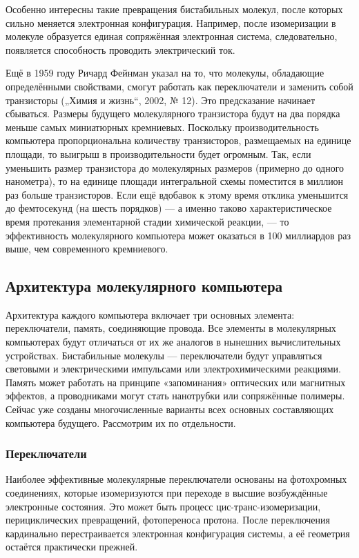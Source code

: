 \documentclass[titlepage, 12pt]{article}
\begin{document}
Особенно интересны такие превращения бистабильных молекул, после которых сильно меняется электронная конфигурация. Например, после изомеризации в молекуле образуется единая сопряжённая электронная система, следовательно, появляется способность проводить электрический ток.

Ещё в 1959 году Ричард Фейнман указал на то, что молекулы, обладающие определёнными свойствами, смогут работать как переключатели и заменить собой транзисторы („Химия и жизнь“, 2002, № 12). Это предсказание начинает сбываться. Размеры будущего молекулярного транзистора будут на два порядка меньше самых миниатюрных кремниевых. Поскольку производительность компьютера пропорциональна количеству транзисторов, размещаемых на единице площади, то выигрыш в производительности будет огромным. Так, если уменьшить размер транзистора до молекулярных размеров (примерно до одного нанометра), то на единице площади интегральной схемы поместится в миллион раз больше транзисторов. Если ещё вдобавок к этому время отклика уменьшится до фемтосекунд (на шесть порядков) — а именно таково характеристическое время протекания элементарной стадии химической реакции, — то эффективность молекулярного компьютера может оказаться в 100 миллиардов раз выше, чем современного кремниевого.


\subsection{Архитектура молекулярного компьютера}
Архитектура каждого компьютера включает три основных элемента: переключатели, память, соединяющие провода. Все элементы в молекулярных компьютерах будут отличаться от их же аналогов в нынешних вычислительных устройствах. Бистабильные молекулы — переключатели будут управляться световыми и электрическими импульсами или электрохимическими реакциями. Память может работать на принципе «запоминания» оптических или магнитных эффектов, а проводниками могут стать нанотрубки или сопряжённые полимеры. Сейчас уже созданы многочисленные варианты всех основных составляющих компьютера будущего. Рассмотрим их по отдельности.

\subsubsection{Переключатели}
Наиболее эффективные молекулярные переключатели основаны на фотохромных соединениях, которые изомеризуются при переходе в высшие возбуждённые электронные состояния. Это может быть процесс цис-транс-изомеризации, перициклических превращений, фотопереноса протона. После переключения кардинально перестраивается электронная конфигурация системы, а её геометрия остаётся практически прежней. 
\end{document}
